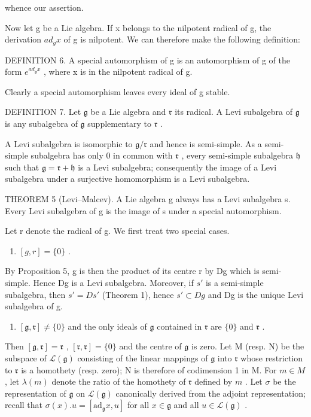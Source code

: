 whence our assertion.

Now let g be a Lie algebra. If x belongs to the nilpotent radical of g, the derivation \(ad_{g}x\) of g is nilpotent. We can therefore make the following definition:

DEFINITION 6. A special automorphism of g is an automorphism of g of the form \(e^{ad_{\mathfrak{g}} x}\) , where x is in the nilpotent radical of g.

Clearly a special automorphism leaves every ideal of g stable.

DEFINITION 7. Let \(\mathfrak{g}\) be a Lie algebra and \(\mathfrak{r}\) its radical. A Levi subalgebra of \(\mathfrak{g}\) is any subalgebra of \(\mathfrak{g}\) supplementary to \(\mathfrak{r}\) .

A Levi subalgebra is isomorphic to \(\mathfrak{g} / \mathfrak{r}\) and hence is semi-simple. As a semi-simple subalgebra has only 0 in common with \(\mathfrak{r}\) , every semi-simple subalgebra \(\mathfrak{h}\) such that \(\mathfrak{g} = \mathfrak{r} + \mathfrak{h}\) is a Levi subalgebra; consequently the image of a Levi subalgebra under a surjective homomorphism is a Levi subalgebra.

THEOREM 5 (Levi--Malcev). A Lie algebra g always has a Levi subalgebra s. Every Levi subalgebra of g is the image of s under a special automorphism.

Let r denote the radical of g. We first treat two special cases.

\begin{enumerate}
\def\labelenumi{(\alph{enumi})}
\tightlist
\item
  \([g, r] = \{0\}\) .
\end{enumerate}

By Proposition 5, g is then the product of its centre r by Dg which is semi-simple. Hence Dg is a Levi subalgebra. Moreover, if \(s'\) is a semi-simple subalgebra, then \(s' = Ds'\) (Theorem 1), hence \(s' \subset Dg\) and Dg is the unique Levi subalgebra of g.

\begin{enumerate}
\def\labelenumi{(\alph{enumi})}
\setcounter{enumi}{1}
\tightlist
\item
  \([\mathfrak{g},\mathfrak{r}]\neq \{0\}\) and the only ideals of \(\mathfrak{g}\) contained in \(\mathfrak{r}\) are \(\{0\}\) and \(\mathfrak{r}\) .
\end{enumerate}

Then \([\mathfrak{g},\mathfrak{r}] = \mathfrak{r}\) , \([\mathfrak{r},\mathfrak{r}] = \{0\}\) and the centre of \(\mathfrak{g}\) is zero. Let M (resp. N) be the subspace of \(\mathcal{L}(\mathfrak{g})\) consisting of the linear mappings of \(\mathfrak{g}\) into \(\mathfrak{r}\) whose restriction to \(\mathfrak{r}\) is a homothety (resp. zero); N is therefore of codimension 1 in M. For \(m\in M\) , let \(\lambda (m)\) denote the ratio of the homothety of \(\mathfrak{r}\) defined by \(m\) . Let \(\sigma\) be the representation of \(\mathfrak{g}\) on \(\mathcal{L}(\mathfrak{g})\) canonically derived from the adjoint representation; recall that \(\sigma (x).u = [\mathrm{ad}_{\mathfrak{g}}x,u]\) for all \(x\in \mathfrak{g}\) and all \(u\in \mathcal{L}(\mathfrak{g})\) .


